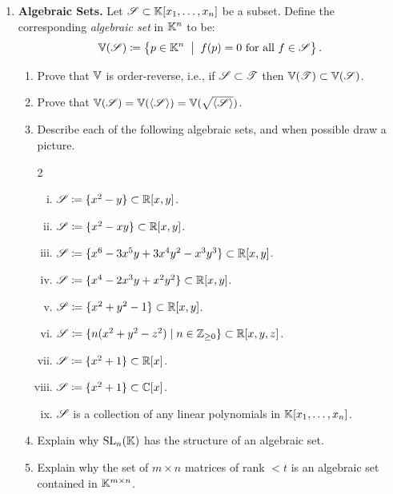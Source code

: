 \documentclass[12pt,reqno]{amsart}
\begin{document}
\begin{enumerate}[leftmargin=*]
\item \textbf{Algebraic Sets.} Let $\mathcal{S} \subset \mathbb{K}[x_1,\ldots,x_n]$ be a subset. Define the corresponding \emph{algebraic set} in $\mathbb{K}^n$ to be:
\[
\mathbb{V}(\mathcal{S}) \coloneqq \left\{ p \in \mathbb{K}^n \;\; \big|\;\; f(p) = 0 \text{ for all $f \in \mathcal{S}$}\right\}.
\]
\begin{enumerate}[label=(\alph*),ref=\theenumi\alph*]
	\item Prove that $\mathbb{V}$ is order-reverse, i.e., if $\mathcal{S} \subset \mathcal{T}$ then $\mathbb{V}(\mathcal{T}) \subset \mathbb{V}(\mathcal{S})$. 
	\item Prove that $\mathbb{V}(\mathcal{S}) = \mathbb{V}(\langle \mathcal{S} \rangle) = \mathbb{V}(\sqrt{\langle \mathcal{S}\rangle})$.
	\item Describe each of the following algebraic sets, and when possible draw a picture. 
	\begin{multicols}{2}
	\begin{enumerate}[(i)]
		\item $\mathcal{S} \coloneqq \{x^2 - y\} \subset \mathbb{R}[x,y]$.
		\item $\mathcal{S} \coloneqq \{x^2 - xy\} \subset \mathbb{R}[x,y]$.
		\item $\mathcal{S} \coloneqq \{x^6 - 3 x^5 y + 3 x^4 y^2 - x^3 y^3\} \subset \mathbb{R}[x,y]$.
		\item $\mathcal{S} \coloneqq \{x^4 -2x^{3}y + x^2y^2\} \subset \mathbb{R}[x,y]$.
		\item $\mathcal{S} \coloneqq \{x^2 + y^2-1\} \subset \mathbb{R}[x,y]$.
		\item $\mathcal{S} \coloneqq \{n(x^2+y^2-z^2) \; | \; n \in \mathbb{Z}_{\geq0} \} \subset \mathbb{R}[x,y,z]$.
		\item $\mathcal{S} \coloneqq \{x^2 + 1 \} \subset \mathbb{R}[x]$.
		\item $\mathcal{S} \coloneqq \{x^2 + 1\} \subset \mathbb{C}[x]$.
		\item $\mathcal{S}$ is a collection of any linear polynomials in $\mathbb{K}[x_1,\ldots,x_n]$.
	\end{enumerate}
	\end{multicols}
	\item Explain why $\operatorname{SL}_{n}(\mathbb{K})$ has the structure of an algebraic set. 
	\item Explain why the set of $m \times n$ matrices of rank $<t$ is an algebraic set contained in $\mathbb{K}^{m \times n}$. 
\end{enumerate}
 

\end{enumerate}
\end{document}
